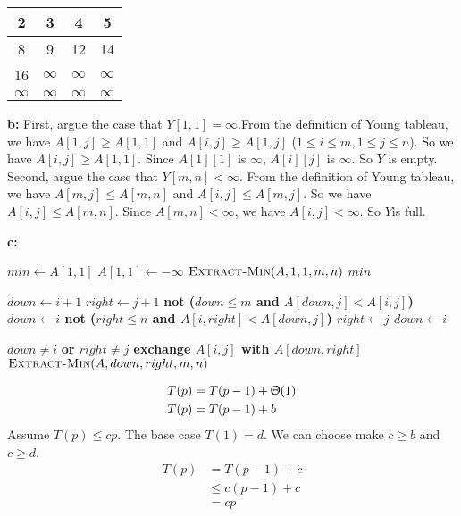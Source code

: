 \documentclass{book}
\begin{document}
\begin{CJK}{UTF8}{gkai}
\begin{tabular}{|c|c|c|c|}
\hline
2 & 3 & 4 & 5 \\ \hline
8 & 9 & 12 & 14 \\ \hline
16 & $\infty$ & $\infty$ & $\infty$ \\ \hline
$\infty$ & $\infty$ & $\infty$ & $\infty$ \\ \hline
\end{tabular}

\textbf{b:} First, argue the case that $Y[1,1] = \infty$.From the definition of 
Young tableau, we have $A[1,j] \ge A[1,1]$ and $A[i,j] \ge A[1,j]$ ($1\le i \le 
m, 1 \le j \le n$). So we have $A[i,j] \ge A[1,1]$.  Since $A[1][1]$ is 
$\infty$, $A[i][j]$ is $\infty$. So $Y$ is empty. Second, argue the case that 
$Y[m,n] < \infty$. From the definition of Young tableau, we have $A[m,j] \le
A[m,n]$ and $A[i,j] \le A[m,j]$. So we have $A[i,j] \le A[m,n]$. Since $A[m,n] < 
\infty$, we have $A[i,j] < \infty$. So $Y$is full.

\textbf{c:}

\begin{codebox}
\li $min \gets A[1,1]$
\li $A[1,1] \gets -\infty$
\li $\textnormal{\scshape Extract-Min}(A,1,1,m,n)$
\li \Return $min$
\end{codebox}

\begin{codebox}
\li $down \gets i+1$
\li $right \gets j+1$
\li \If \bf{not} ($down \le m$ \bf{and} $A[down,j] < A[i,j]$)
\li \Then $down \gets i$
\End
\li \If \bf{not} ($right \le n$ \bf{and} $A[i,right] < A[down,j]$)
\li \Then $right \gets j$
\li \Else $down \gets i$
\End

\li \If $down \ne i$ \bf{or} $right \ne j$
\li \Then exchange $A[i,j]$ with $A[down,right]$
\li $\textnormal{\scshape Extract-Min}(A,down,right,m,n)$
\End
\end{codebox}

\begin{align*}
T(p) & = T(p-1) + \Uptheta(1) \\
T(p) & = T(p-1) + b \\
\end{align*}
Assume $T(p) \le cp$. The base case $T(1) = d$. We can choose make $c \ge b$ and 
$c \ge d$.
\begin{align*}
T(p) & = T(p-1) + c \\
& \le c(p-1) + c \\
& =cp
\end{align*}


\end{CJK}
\end{document}
